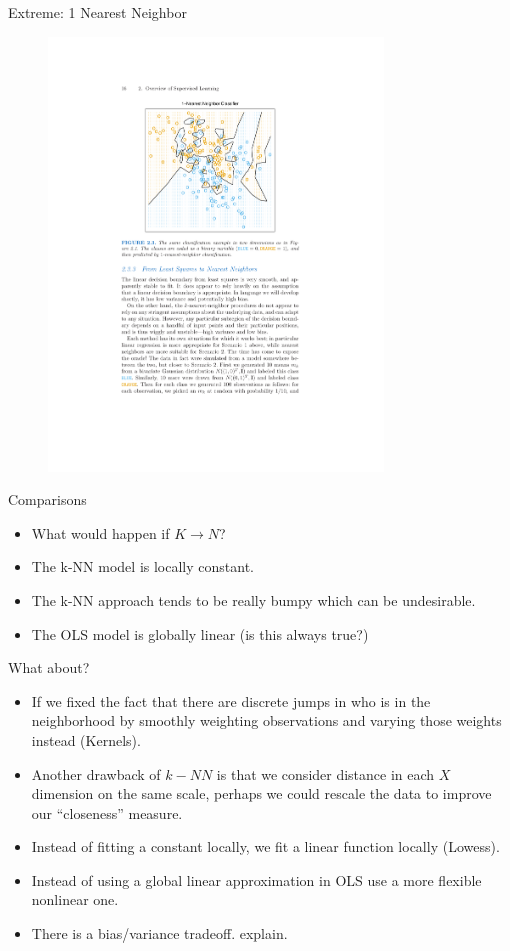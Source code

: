 \documentclass[11pt,handout,xcolor=pdftex,dvipsnames,table,mathserif,aspectratio=169]{beamer}
\begin{document}
\begin{frame}{Extreme: 1 Nearest Neighbor}
\begin{figure}[htbp]
\begin{center}
\includegraphics[width=3.5in]{./resources/classifier1nn.pdf}
\label{class15nn}
\end{center}
\end{figure}
\end{frame}

\begin{frame}{Comparisons}
\begin{itemize}
\item What would happen if $K \rightarrow N$?
\item The k-NN model is locally constant.
\item The k-NN approach tends to be really bumpy which can be undesirable.
\item The OLS model is globally linear (is this always true?)
\end{itemize}
\end{frame}
\begin{frame}{What about?}
\begin{itemize}
\item If we fixed the fact that there are discrete jumps in who is in the neighborhood by smoothly weighting observations and varying those weights instead (Kernels).
\item Another drawback of $k-NN$ is that we consider distance in each $X$ dimension on the same scale, perhaps we could rescale the data to improve our ``closeness'' measure.
\item Instead of fitting a constant locally, we fit a linear function locally (Lowess).
\item Instead of using a global linear approximation in OLS use a more flexible nonlinear one.
\item There is a bias/variance tradeoff. \alert{explain}.
\end{itemize}
\end{frame}
\end{document}
